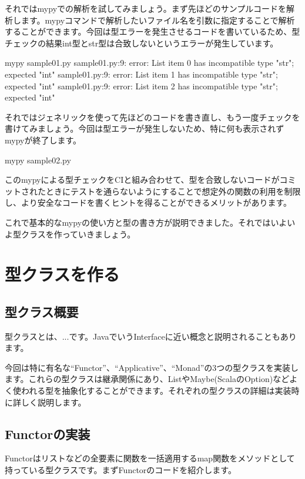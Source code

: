 それではmypyでの解析を試してみましょう。まず先ほどのサンプルコードを解析します。mypyコマンドで解析したいファイル名を引数に指定することで解析することができます。今回は型エラーを発生させるコードを書いているため、型チェックの結果int型とstr型は合致しないというエラーが発生しています。

\begin{bashcode}
mypy sample01.py
sample01.py:9: error: List item 0 has incompatible type "str"; expected "int"
sample01.py:9: error: List item 1 has incompatible type "str"; expected "int"
sample01.py:9: error: List item 2 has incompatible type "str"; expected "int"
\end{bashcode}

それではジェネリックを使って先ほどのコードを書き直し、もう一度チェックを書けてみましょう。今回は型エラーが発生しないため、特に何も表示されずmypyが終了します。


\begin{bashcode}
mypy sample02.py
\end{bashcode}

このmypyによる型チェックをCIと組み合わせて、型を合致しないコードがコミットされたときにテストを通らないようにすることで想定外の関数の利用を制限し、より安全なコードを書くヒントを得ることができるメリットがあります。

これで基本的なmypyの使い方と型の書き方が説明できました。それではいよいよ型クラスを作っていきましょう。

\section{型クラスを作る}
\subsection{型クラス概要}
型クラスとは、...です。JavaでいうInterfaceに近い概念と説明されることもあります。

今回は特に有名な``Functor''、``Applicative''、``Monad''の3つの型クラスを実装します。これらの型クラスは継承関係にあり、ListやMaybe(ScalaのOption)などよく使われる型を抽象化することができます。それぞれの型クラスの詳細は実装時に詳しく説明します。

\subsection{Functorの実装}
Functorはリストなどの全要素に関数を一括適用するmap関数をメソッドとして持っている型クラスです。まずFunctorのコードを紹介します。

